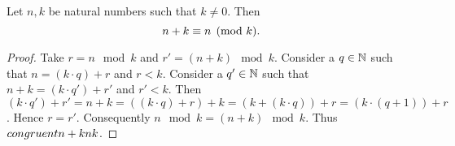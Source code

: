 \documentclass[../arithmetic.tex]{subfiles}
\begin{document}
  \begin{forthel}
    \begin{proposition}
      Let $n, k$ be natural numbers such that $k \neq 0$.
      Then \[ n + k\equiv n\pmod{k}. \]
    \end{proposition}
    \begin{proof}
      Take $r = n \mod k$ and $r' = (n \plus k) \mod k$.
      Consider a $q \in \mathbb{N}$ such that $n = (k \cdot q) \plus r$ and $r \less k$.
      Consider a $q' \in \mathbb{N}$ such that $n \plus k = (k \cdot q') \plus r'$ and
      $r' \less k$.
      Then $(k \cdot q') \plus r'
        = n \plus k
        = ((k \cdot q) \plus r) \plus k
        = (k \plus (k \cdot q)) \plus r
        = (k \cdot (q \plus 1)) \plus r$.
      Hence $r = r'$.
      Consequently $n \mod k = (n \plus k) \mod k$.
      Thus $\\congruent{n + k}{n}{k}$.
    \end{proof}
  \end{forthel}
\end{document}
